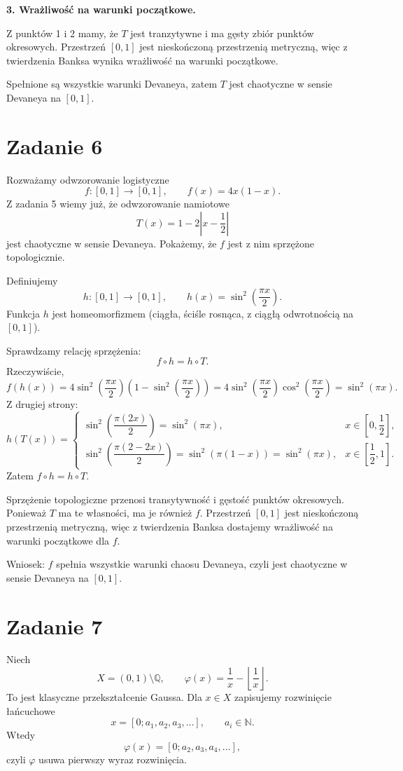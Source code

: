 \documentclass[11pt,a4paper]{article}
\newcommand{\N}{\mathbb{N}}
\newcommand{\Q}{\mathbb{Q}}
\theoremstyle{plain}
\theoremstyle{definition}
\begin{document}
\textbf{3. Wrażliwość na warunki początkowe.}

Z punktów 1 i 2 mamy, że $T$ jest tranzytywne i ma gęsty zbiór punktów okresowych. Przestrzeń $[0,1]$ jest nieskończoną przestrzenią metryczną, więc z twierdzenia Banksa wynika wrażliwość na warunki początkowe.

Spełnione są wszystkie warunki Devaneya, zatem $T$ jest chaotyczne w sensie Devaneya na $[0,1]$.

\section{Zadanie 6}

Rozważamy odwzorowanie logistyczne
\[
f:[0,1]\to[0,1],
\qquad
f(x)=4x(1-x).
\]
Z zadania 5 wiemy już, że odwzorowanie namiotowe
\[
T(x)=1-2\left|x-\frac12\right|
\]
jest chaotyczne w sensie Devaneya. Pokażemy, że $f$ jest z nim sprzężone topologicznie.

Definiujemy
\[
h:[0,1]\to[0,1],
\qquad
h(x)=\sin^2\!\left(\frac{\pi x}{2}\right).
\]
Funkcja $h$ jest homeomorfizmem (ciągła, ściśle rosnąca, z ciągłą odwrotnością na $[0,1]$).

Sprawdzamy relację sprzężenia:
\[
f\circ h = h\circ T.
\]
Rzeczywiście,
\[
f(h(x))
=4\sin^2\!\left(\frac{\pi x}{2}\right)\left(1-\sin^2\!\left(\frac{\pi x}{2}\right)\right)
=4\sin^2\!\left(\frac{\pi x}{2}\right)\cos^2\!\left(\frac{\pi x}{2}\right)
=\sin^2(\pi x).
\]
Z drugiej strony:
\[
h(T(x))=
\begin{cases}
\sin^2\!\left(\dfrac{\pi(2x)}{2}\right)=\sin^2(\pi x), & x\in\left[0,\dfrac12\right],\\
\sin^2\!\left(\dfrac{\pi(2-2x)}{2}\right)=\sin^2(\pi(1-x))=\sin^2(\pi x), & x\in\left[\dfrac12,1\right].
\end{cases}
\]
Zatem $f\circ h=h\circ T$.

Sprzężenie topologiczne przenosi transytywność i gęstość punktów okresowych. Ponieważ $T$ ma te własności, ma je również $f$.
Przestrzeń $[0,1]$ jest nieskończoną przestrzenią metryczną, więc z twierdzenia Banksa dostajemy wrażliwość na warunki początkowe dla $f$.

Wniosek: $f$ spełnia wszystkie warunki chaosu Devaneya, czyli jest chaotyczne w sensie Devaneya na $[0,1]$.

\section{Zadanie 7}

Niech
\[
X=(0,1)\setminus\Q,
\qquad
\varphi(x)=\frac1x-\left\lfloor\frac1x\right\rfloor.
\]
To jest klasyczne przekształcenie Gaussa. Dla $x\in X$ zapisujemy rozwinięcie łańcuchowe
\[
x=[0;a_1,a_2,a_3,\dots],\qquad a_i\in\N.
\]
Wtedy
\[
\varphi(x)=[0;a_2,a_3,a_4,\dots],
\]
czyli $\varphi$ usuwa pierwszy wyraz rozwinięcia.
\end{document}
